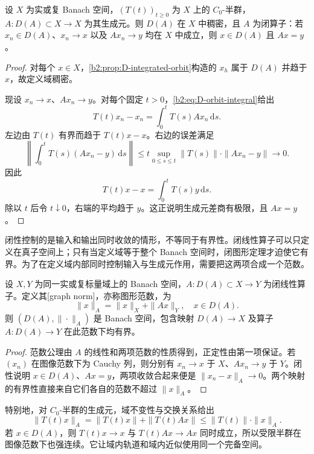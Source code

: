 \begin{proposition}[生成元的稠密定义与闭性]\label{b2:prop:D-generator-closed}
设 \(X\) 为实或复 Banach 空间，\((T(t))_{t\geq0}\) 为 \(X\) 上的 \(C_0\)-半群，\(A:D(A)\subset X\to X\) 为其生成元。则 \(D(A)\) 在 \(X\) 中稠密，且 \(A\) 为闭算子：若 \(x_n\in D(A)\)、\(x_n\to x\) 以及 \(Ax_n\to y\) 均在 \(X\) 中成立，则 \(x\in D(A)\) 且 \(Ax=y\)。
\end{proposition}
\begin{proof}
对每个 \(x\in X\)，\cref{b2:prop:D-integrated-orbit}构造的 \(x_h\) 属于 \(D(A)\) 并趋于 \(x\)，故定义域稠密。

现设 \(x_n\to x\)、\(Ax_n\to y\)。对每个固定 \(t>0\)，\eqref{b2:eq:D-orbit-integral}给出
\[
 T(t)x_n-x_n=\int_0^tT(s)Ax_n\,\mathrm ds.
\]
左边由 \(T(t)\) 有界而趋于 \(T(t)x-x\)。右边的误差满足
\[
 \left\|\int_0^tT(s)(Ax_n-y)\,\mathrm ds\right\|
 \leq t\sup_{0\leq s\leq t}\|T(s)\|\cdot\|Ax_n-y\|
 \longrightarrow0.
\]
因此
\[
 T(t)x-x=\int_0^tT(s)y\,\mathrm ds.
\]
除以 \(t\) 后令 \(t\downarrow0\)，右端的平均趋于 \(y\)。这正说明生成元差商有极限，且 \(Ax=y\)。
\end{proof}
闭性控制的是输入和输出同时收敛的情形，不等同于有界性。闭线性算子可以只定义在真子空间上；只有当定义域等于整个 Banach 空间时，闭图形定理才迫使它有界。为了在定义域内部同时控制输入与生成元作用，需要把这两项合成一个范数。

\begin{proposition}[图像范数的完备性]\label{b2:prop:D-graph-norm}
设 \(X,Y\) 为同一实或复标量域上的 Banach 空间，\(A:D(A)\subset X\to Y\) 为闭线性算子。定义其[graph norm]，亦称图形范数，为
\[
 \|x\|_A=\|x\|_X+\|Ax\|_Y,\quad x\in D(A).
\]
则 \((D(A),\|\cdot\|_A)\) 是 Banach 空间，包含映射 \(D(A)\to X\) 及算子 \(A:D(A)\to Y\) 在此范数下均有界。
\end{proposition}
\begin{proof}
范数公理由 \(A\) 的线性和两项范数的性质得到，正定性由第一项保证。若 \((x_n)\) 在图像范数下为 Cauchy 列，则分别有 \(x_n\to x\) 于 \(X\)、\(Ax_n\to y\) 于 \(Y\)。闭性说明 \(x\in D(A)\)、\(Ax=y\)，两项收敛合起来便是 \(\|x_n-x\|_A\to0\)。两个映射的有界性直接来自它们各自的范数不超过 \(\|x\|_A\)。
\end{proof}
特别地，对 \(C_0\)-半群的生成元，域不变性与交换关系给出
\[
 \|T(t)x\|_A
 =\|T(t)x\|+\|T(t)Ax\|
 \leq\|T(t)\|\cdot\|x\|_A.
\]
若 \(x\in D(A)\)，则 \(T(t)x\to x\) 与 \(T(t)Ax\to Ax\) 同时成立，所以受限半群在图像范数下也强连续。它让域内轨道和域内近似使用同一个完备空间。

